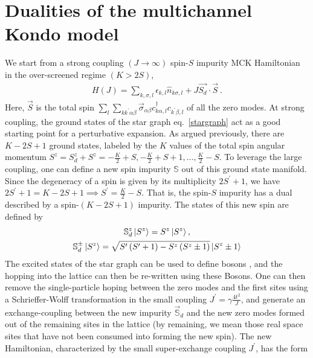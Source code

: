 \documentclass[reprint,prb,superscriptaddress]{revtex4-2}
\begin{document}
\section{Dualities of the multichannel Kondo model}
We start from a strong coupling \((J \to \infty)\) spin-\(S\) impurity MCK Hamiltonian in the over-screened regime \(\left( K > 2S \right) \),
\begin{equation}\begin{aligned}
	\label{strong_ham}
	H(J) = \sum_{k,\sigma,l}\epsilon_{k,l} \hat n_{k\sigma,l} + J \vec{S_d}\cdot\vec{S}~.
\end{aligned}\end{equation}
Here, \(\vec S\) is the total spin \(\sum_l \sum_{kk^\prime \alpha\beta} \vec \sigma_{\alpha\beta}c^\dagger_{k\alpha,l}c_{k^\prime\beta,l}\) of all the zero modes. At strong coupling, the ground states of the star graph eq.~\ref{stargraph} act as a good starting point for a perturbative expansion. As argued previously, there are \(K-2S+1\) ground states, labeled by the \(K\) values of the total spin angular momentum \(S^z = S_d^z + S^z = -\frac{K}{2} + S, -\frac{K}{2} + S + 1, \ldots, \frac{K}{2} - S\). To leverage the large coupling, one can define a new spin impurity \(\mathbb{S}\) out of this ground state manifold. Since the degeneracy of a spin is given by its multiplicity \(2S^\prime + 1\), we have \(2S^\prime + 1 = K-2S+1 \implies S^\prime = \frac{K}{2} - S\). That is, the spin-\(S\) impurity has a dual described by a spin-\((K-2S+1)\) impurity. The states of this new spin are defined by
\begin{gather}
	\mathbb{S}_d^z \ket{S^z} = S^z \ket{S^z},\nonumber\\
	\mathbb{S}_d^\pm \ket{S^z} = \sqrt{S^\prime\left( S^\prime + 1 \right) - S^z\left( S^z \pm 1\right)} \ket{S^z \pm 1}
\end{gather}
The excited states of the star graph can be used to define bosons \cite{kroha_kolf_2007}, and the hopping into the lattice can then be re-written using these Bosons. One can then remove the single-particle hoping between the zero modes and the first sites using a Schrieffer-Wolff transformation in the small coupling \(J^\prime = \gamma \frac{4t^2}{J}\), and generate an exchange-coupling between the new impurity \(\vec {\mathbb{S}}_d\) and the new zero modes formed out of the remaining sites in the lattice \cite{kroha_kolf_2007} (by remaining, we mean those real space sites that have not been consumed into forming the new spin). The new Hamiltonian, characterized by the small super-exchange  coupling \(J^\prime\), has the form
\end{document}
